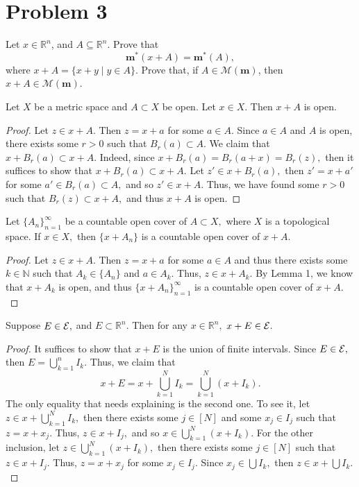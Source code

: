 \documentclass[11pt]{article}
\newcommand{\bbN}{\mathbb{N}}
\newcommand{\bbR}{\mathbb{R}}
\begin{document}
\newpage
\section*{Problem 3}
\begin{problem}
    Let $x \in \mathbb{R}^n$, and $A \subseteq \mathbb{R}^n$. Prove that
\[
\mathbf{m}^*(x + A) = \mathbf{m}^*(A),
\]
where $x + A = \{x + y \mid y \in A\}$. Prove that, if $A \in \mathcal{M}(\mathbf{m})$, then $x + A \in \mathcal{M}(\mathbf{m})$.
\end{problem}
\begin{solution}
    \begin{lemma}
    Let $X$ be a metric space and $A \subset X$ be open. Let $x\in X.$ Then $x + A$ is open.
    \end{lemma}
    \begin{proof}
        Let $z \in x + A.$ Then $z = x + a$ for some $a \in A.$ Since $a \in A$ and $A$ is open, there exists some $r>0$ such that $B_r(a)\subset A.$ We claim that $x + B_r(a) \subset x + A.$ Indeed, since $x + B_r(a) = B_r(a + x) = B_r(z),$ then it suffices to show that $x + B_r(a) \subset x + A.$ Let $z' \in x + B_r(a),$ then $z' = x + a'$ for some $a' \in B_r(a) \subset A,$ and so $z' \in x + A.$ Thus, we have found some $r>0$ such that $B_r(z)\subset x + A,$ and thus $x + A$ is open.
    \end{proof}
    \begin{lemma}
        Let $\{A_n\}_{n =1}^\infty$ be a countable open cover of $A \subset X,$ where $X$ is a topological space. If $x \in X,$ then $\{x + A_n\}$ is a countable open cover of $x + A.$
    \end{lemma}
    \begin{proof}
        Let $z \in x + A.$ Then $z = x + a$ for some $a\in A$ and thus there exists some $k \in \bbN$ such that $A_k \in \{A_n\}$ and $a \in A_k.$ Thus, $z\in x + A_k.$ By Lemma 1, we know that $x + A_k$ is open, and thus $\{x + A_n\}_{n =1}^\infty$ is a countable open cover of $x + A.$
    \end{proof}
    \begin{lemma}
     Suppose $E \in \cal E,$ and $E \subset \bbR^n.$ Then for any $x\in \bbR^n,$ $x + E \in \cal E.$
    \end{lemma}
    \begin{proof}
        It suffices to show that $x + E$ is the union of finite intervals. Since $E \in \cal E,$ then $E = \bigcup_{k=1}^n I_k.$ Thus, we claim that
        \[x + E = x + \bigcup_{k=1}^N I_k = \bigcup_{k=1}^N(x + I_k).\] The only equality that needs explaining is the second one. To see it, let $z \in x + \bigcup_{k=1}^N I_k,$ then there exists some $j \in [N]$ and some $x_j \in I_j$ such that $z = x + x_j.$ Thus, $z \in x + I_j,$ and so $x \in \bigcup_{k=1}^N (x + I_k).$ For the other inclusion, let $z\in \bigcup_{k=1}^N (x + I_k),$ then there exists some $j \in [N]$ such that $z\in x + I_j.$ Thus, $z = x + x_j$ for some $x_j \in I_j.$ Since $x_j \in \bigcup I_k,$ then $z \in x + \bigcup I_k.$
        

\end{proof}
\end{solution}
\end{document}
